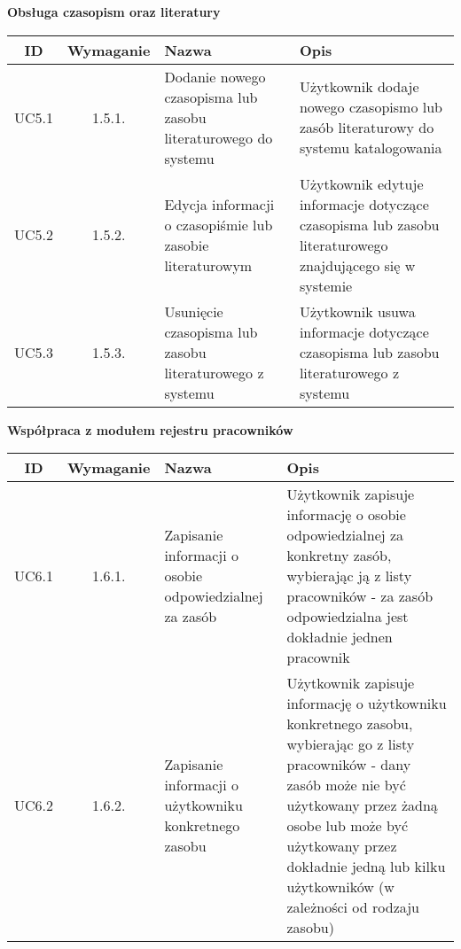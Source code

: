 \begin{table}[!ht]
	\begin{center}
		{\Large\bf Obsługa czasopism oraz literatury} \\
	\end{center}
\begin{tabular}{| c | c | p{} | p{} |}
	\hline \textbf{ID} & \textbf{Wymaganie} & \textbf{Nazwa} & \textbf{Opis} \\
	\hline UC5.1 & 1.5.1. & Dodanie nowego czasopisma lub zasobu literaturowego do systemu & Użytkownik dodaje nowego czasopismo lub zasób literaturowy do systemu katalogowania \\
	\hline UC5.2 & 1.5.2. & Edycja informacji o czasopiśmie lub zasobie literaturowym & Użytkownik edytuje informacje dotyczące czasopisma lub zasobu literaturowego znajdującego się w systemie \\
	\hline UC5.3 & 1.5.3.  & Usunięcie czasopisma lub zasobu literaturowego z systemu & Użytkownik usuwa informacje dotyczące czasopisma lub zasobu literaturowego z systemu \\
	\hline
\end{tabular}
\end{table}

\begin{table}[!ht]
	\begin{center}
		{\Large\bf Współpraca z modułem rejestru pracowników} \\
	\end{center}
\begin{tabular}{| c | c | p{} | p{} |}
	\hline \textbf{ID} & \textbf{Wymaganie} & \textbf{Nazwa} & \textbf{Opis} \\
	\hline UC6.1 & 1.6.1. & Zapisanie informacji o osobie odpowiedzialnej za zasób & Użytkownik zapisuje informację o osobie odpowiedzialnej za konkretny zasób, wybierając ją z listy pracowników - za zasób odpowiedzialna jest dokładnie jednen pracownik \\
	\hline UC6.2 & 1.6.2. & Zapisanie informacji o użytkowniku konkretnego zasobu & Użytkownik zapisuje informację o użytkowniku konkretnego zasobu,  wybierając go z listy pracowników - dany zasób może nie być użytkowany przez żadną osobe lub może być użytkowany przez dokładnie jedną lub kilku użytkowników (w zależności od rodzaju zasobu) \\
	\hline
\end{tabular}
\end{table}

